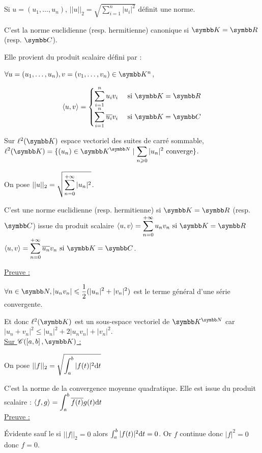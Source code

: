 \begin{exemple}
    Si $u = (u_1, \dots, u_n)$, $\displaystyle ||u||_2 = \sqrt{\sum_{i = 1}^{n} |u_i|^2}$
    définit une norme. 

    C'est la norme euclidienne (resp. hermitienne) canonique si $\K = \R$ (resp. $\C$). 

    Elle provient du produit scalaire défini par : 

    $\forall u = (u_1, \dots, u_n), v = (v_1, \dots, v_n) \in \K^n$,

    \[
    \langle u, v \rangle = \begin{cases}
        \ds \sum_{i = 1}^{n} u_i v_i & ~ \text{si} ~ \K = \R \\
        \ds \sum_{i = 1}^{n} \overline{u_i} v_i & ~ \text{si} ~ \K = \C \\
    \end{cases}
    \]

    Sur $\ell^2(\K)$ espace vectoriel des suites de carré sommable,
    $\ds \ell^2(\K) = \{(u_n) \in \K^{\N} \mid \sum_{n \geqslant 0} |u_n|^2 \text{ converge}\}$.
    
    On pose $\displaystyle ||u||_2 = \sqrt{\sum_{n = 0 }^{+ \infty} |u_n|^2}$.

    C'est une norme euclidienne (resp. hermitienne) si $\K = \R$ (resp. $\C$) issue
    du produit scalaire $\ds \langle u, v \rangle = \sum_{n = 0}^{+\infty} u_n v_n ~ \text{si} ~ \K = \R$
    $\ds \langle u, v \rangle = \sum_{n = 0}^{+\infty} \overline{u_n} v_n ~ \text{si} ~ \K = \C$.

    \uline{Preuve :}

    \svspace $\ds \forall n \in \N, |u_n v_n| \leqslant \frac 1 2 (|u_n|^2 + |v_n|^2)$ est le terme
    général d'une série convergente. 

    Et donc $\ell^2(\K)$ est un sous-espace vectoriel de $\K^{\N}$ car $|u_n + v_n|^2 \leqslant |u_n|^2 + 2 |u_n v_n| + |v_n|^2$. \\

    \uline{Sur $\mathscr C(\inter{a}{b}, \K)$ :}

    \avspace On pose $\displaystyle ||f||_2 = \sqrt{\int_{a}^{b} |f(t)|^2 \text d t}$

    C'est la norme de la convergence moyenne quadratique. Elle est issue du produit scalaire :
    $\displaystyle \langle f, g \rangle = \int_{a}^{b} \overline{f(t)} g(t) \text d t$ \\

    \uline{Preuve :}

    Évidente sauf le si $||f||_2 = 0$ alors $\int_{a }^{b } |f(t)|^2 \text d t = 0$. Or $f$ continue donc $|f|^2 = 0 $ donc $f = 0$.
\end{exemple}



